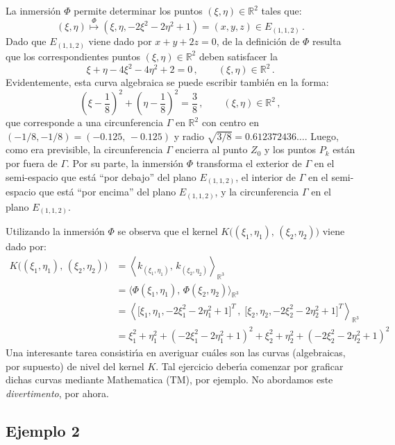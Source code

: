 \documentclass[12pt,reqno]{amsart}
\begin{document}
\smallskip\noindent
La inmersi\'on $\Phi$ permite determinar los puntos
$(\xi,\eta)\in\mathbb{R}^2$ tales que:
$$
(\xi,\eta) \overset{\Phi}{\longmapsto} 
(\xi,\eta,-2\xi^2-2\eta^2+1) = (x,y,z)\in E_{(1,1,2)}\,.
$$
Dado que $E_{(1,1,2)}$ viene dado por $x+y+2z=0$, de la definici\'on de
$\Phi$ resulta que los correspondientes puntos $(\xi,\eta)\in\mathbb{R}^2$
deben satisfacer la 
$$
\xi + \eta - 4\xi^2 - 4\eta^2 + 2 = 0\,,\qquad
(\xi,\eta)\in\mathbb{R}^2\,.
$$
Evidentemente, esta curva algebraica se puede escribir tambi\'en en la
forma:
$$
\left( \xi-\frac18 \right)^2 + \left( \eta-\frac18 \right)^2
= \frac38\,,\qquad (\xi,\eta)\in\mathbb{R}^2\,,
$$
que corresponde a una circunferencia $\Gamma$ en $\mathbb{R}^2$
con centro en $(-1/8,-1/8)=(-0.125,\,-0.125)$ y radio 
$\sqrt{3/8}=0.612372436\dots$.
Luego, como era previsible, la circunferencia $\Gamma$ encierra
al punto $Z_0$ y los puntos $P_k$ est\'an por fuera de $\Gamma$.
Por su parte, la inmersi\'on $\Phi$ transforma
el exterior de $\Gamma$ en el semi-espacio que est\'a
``por debajo'' del plano $E_{(1,1,2)}$, 
el interior de $\Gamma$ en el semi-espacio que est\'a
``por encima'' del plano $E_{(1,1,2)}$, y
la circunferencia $\Gamma$ en el plano $E_{(1,1,2)}$.

\smallskip\noindent
Utilizando la inmersi\'on $\Phi$ se observa que el kernel
$K\big( (\xi_1,\eta_1),\,(\xi_2,\eta_2) \big)$ viene dado por:
\begin{align*}
K\big( (\xi_1,\eta_1),\,(\xi_2,\eta_2) \big)
&= \left\langle k_{(\xi_1,\eta_1)},\,k_{(\xi_2,\eta_2)}
   \right\rangle_{\mathbb{R}^3} \\
&= \big\langle \Phi(\xi_1,\eta_1),\,\Phi(\xi_2,\eta_2)
   \big\rangle_{\mathbb{R}^3} \\
&= \left\langle \big[\xi_1,\eta_1,-2\xi_1^2-2\eta_1^2+1\big]^T\,,\;
   \big[\xi_2,\eta_2,-2\xi_2^2-2\eta_2^2+1\big]^T
   \right\rangle_{\mathbb{R}^3} \\
&= \xi_1^2 + \eta_1^2 + \left(-2\xi_1^2-2\eta_1^2+1\right)^2 +
   \xi_2^2 + \eta_2^2 + \left(-2\xi_2^2-2\eta_2^2+1\right)^2
\end{align*} 
Una interesante tarea consistir\'\i a en averiguar cu\'ales son
las curvas (algebraicas, por supuesto) de nivel del kernel $K$.
Tal ejercicio deber\'\i a comenzar por graficar dichas curvas
mediante Mathematica (TM), por ejemplo.
No abordamos este {\em divertimento\/}, por ahora.

\subsection{Ejemplo 2}
\end{document}
